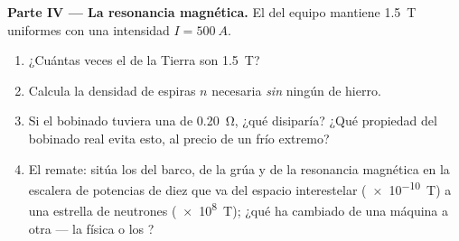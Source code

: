 \begin{problem}
\medskip
\noindent\textbf{Parte IV --- La resonancia magnética.}
El  del equipo mantiene \qty{1.5}{T} uniformes con una
intensidad $I = \qty{500}{A}$.
\begin{enumerate}[resume]
  \item ¿Cuántas veces el  de la Tierra son \qty{1.5}{T}?
  \item Calcula la densidad de espiras $n$ necesaria \emph{sin} ningún
         de hierro.
  \item Si el bobinado tuviera una  de \qty{0.20}{\ohm}, ¿qué
         disiparía? ¿Qué propiedad del bobinado real evita esto,
        al precio de un frío extremo?
  \item El remate: sitúa los  del barco, de la grúa y de la
        resonancia magnética en la escalera de potencias de diez que va
        del espacio interestelar (\qty{e-10}{T}) a una estrella de
        neutrones (\qty{e8}{T}); ¿qué ha cambiado de una máquina a otra
        --- la física o los ?
\end{enumerate}
\end{problem}
